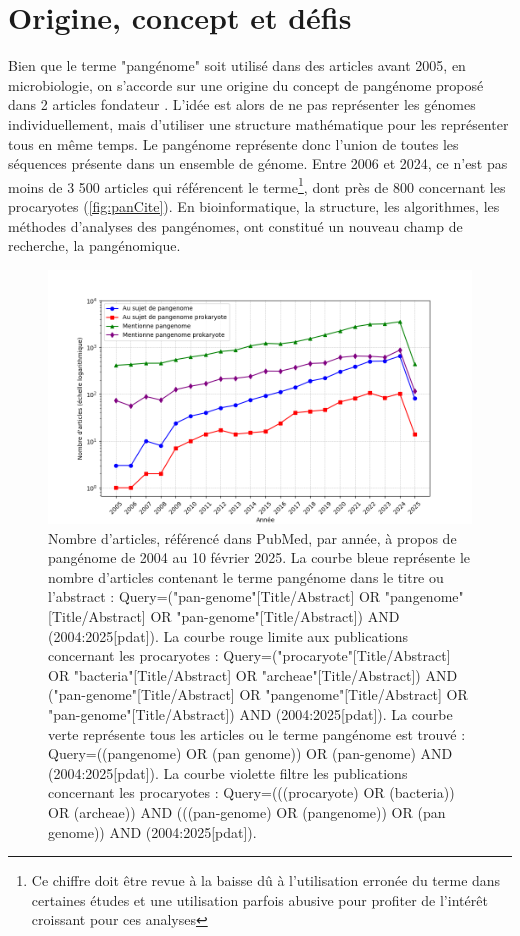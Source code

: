 \section{Origine, concept et défis}

Bien que le terme "pangénome" soit utilisé dans des articles avant 2005, en microbiologie, on s'accorde sur une origine du concept de pangénome proposé dans 2 articles fondateur \cite{medini_microbial_2005,tettelin_genome_2005}. L'idée est alors de ne pas représenter les génomes individuellement, mais d'utiliser une structure mathématique pour les représenter tous en même temps. Le pangénome représente donc l'union de toutes les séquences présente dans un ensemble de génome. Entre 2006 et 2024, ce n'est pas moins de 3 500 articles qui référencent le terme\footnote{Ce chiffre doit être revue à la baisse dû à l'utilisation erronée du terme dans certaines études et une utilisation parfois abusive pour profiter de l'intérêt croissant pour ces analyses}, dont près de 800 concernant les procaryotes (\autoref{fig:panCite}). En bioinformatique, la structure, les algorithmes, les méthodes d'analyses des pangénomes, ont constitué un nouveau champ de recherche, la pangénomique.

\begin{figure}[htbp]
    \centering
    \includegraphics[width=\linewidth]{images/pangenomeCitation.png}
    \caption[Bibliométrie pangénome]{Nombre d'articles, référencé dans PubMed, par année, à propos de pangénome de 2004 au 10 février 2025. La courbe bleue représente le nombre d'articles contenant le terme pangénome dans le titre ou l'abstract : Query=("pan-genome"[Title/Abstract] OR "pangenome"[Title/Abstract] OR "pan-genome"[Title/Abstract]) AND (2004:2025[pdat]). La courbe rouge limite aux publications concernant les procaryotes : Query=("procaryote"[Title/Abstract] OR "bacteria"[Title/Abstract] OR "archeae"[Title/Abstract]) AND ("pan-genome"[Title/Abstract] OR "pangenome"[Title/Abstract] OR "pan-genome"[Title/Abstract]) AND (2004:2025[pdat]). La courbe verte représente tous les articles ou le terme pangénome est trouvé : Query=((pangenome) OR (pan genome)) OR (pan-genome) AND (2004:2025[pdat]). La courbe violette filtre les publications concernant les procaryotes : Query=(((procaryote) OR (bacteria)) OR (archeae)) AND (((pan-genome) OR (pangenome)) OR (pan genome)) AND (2004:2025[pdat]).}
    \label{fig:panCite}
\end{figure}

